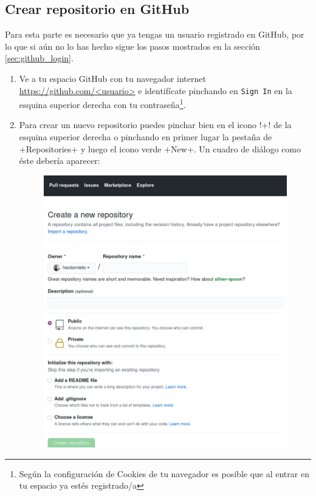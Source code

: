\documentclass[a5paper,10pt]{article}
\begin{document}
    \subsection{Crear repositorio en GitHub}
      Para esta parte es necesario que ya tengas un usuario registrado en GitHub, por lo que si  aún no lo has hecho sigue los pasos mostrados en la sección \ref{sec:github_login}.
      
      \begin{enumerate}
       \item Ve a tu espacio GitHub con tu navegador internet \url{https://github.com/<usuario>} e identifícate pinchando en \verb+Sign In+ en la esquina superior derecha con tu contraseña\footnote{Según la configuración de Cookies de tu navegador es posible que al entrar en tu espacio ya estés registrado/a}.
       \item Para crear un nuevo repositorio puedes pinchar bien en el icono \cverb!+! de la esquina superior derecha o pinchando en primer lugar la pestaña de \cverb+Repositories+ y luego el icono verde \cverb+New+. Un cuadro de diálogo como éste debería aparecer:
       
       \begin{figure}[H]\centering
        \hspace{-1cm}\includegraphics[width=1.2\columnwidth]{github_create_new_repo}
       \end{figure}
       

\end{enumerate}
\end{document}
